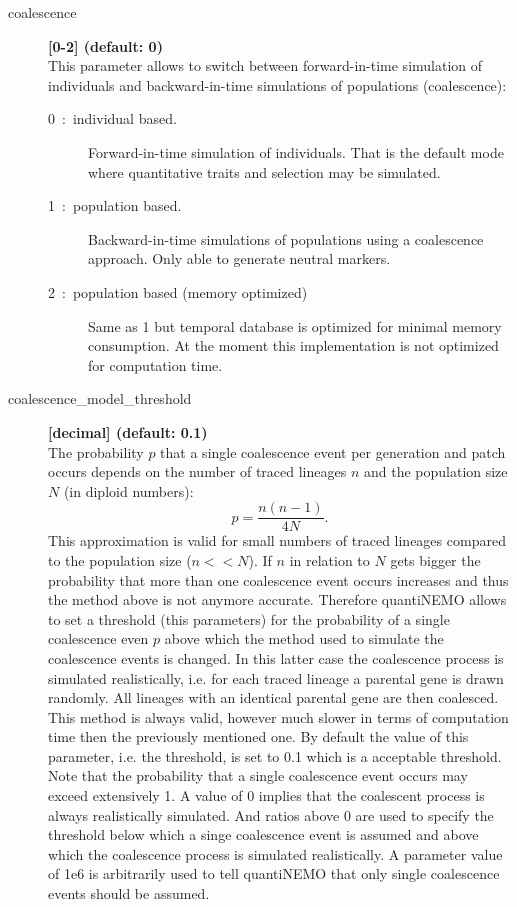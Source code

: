 \documentclass[letterpaper,12pt,oneside]{book}
\begin{document}
\begin{description}
\item[coalescence] \textbf{[0-2] (default: 0)}\\ 
This parameter allows to switch between forward-in-time simulation of individuals and backward-in-time simulations of populations (coalescence):
\begin{description}
\item[0~:~individual based.] Forward-in-time simulation of individuals. That is the default mode where quantitative traits and selection may be simulated. 
\item[1~:~population based.] Backward-in-time simulations of populations using a coalescence approach. Only able to generate neutral markers.
\item[2~:~population based (memory optimized)] Same as 1 but temporal database is optimized for minimal memory consumption. At the moment this implementation is not optimized for computation time.
\end{description}

\item[coalescence\_model\_threshold] \textbf{[decimal] (default: 0.1)}\\ 
The probability $p$ that a single coalescence event per generation and patch occurs depends on the number of traced lineages $n$ and the population size $N$ (in diploid numbers):
	\[
	p = \frac{n(n-1)}{4N}.
\]  
This approximation is valid for small numbers of traced lineages compared to the population size ($n<<N$). If $n$ in relation to $N$ gets bigger the probability that more than one coalescence event occurs increases and thus the method above is not anymore accurate. Therefore quantiNEMO allows to set a threshold (this parameters) for the probability of a single coalescence even $p$ above which the method used to simulate the coalescence events is changed. In this latter case the coalescence process is simulated realistically, i.e. for each traced lineage a parental gene is drawn randomly. All lineages with an identical parental gene are then coalesced. This method is always valid, however much slower in terms of computation time then the previously mentioned one. By default the value of this parameter, i.e. the threshold, is set to 0.1 which is a acceptable threshold. Note that the probability that a single coalescence event occurs may exceed extensively 1. A value of 0 implies that the coalescent process is always realistically simulated. And ratios above 0 are used to specify the threshold below which a singe coalescence event is assumed and above which the coalescence process is simulated realistically. A parameter value of 1e6 is arbitrarily used to tell quantiNEMO that only single coalescence events should be assumed.    


\end{description}
\end{document}
